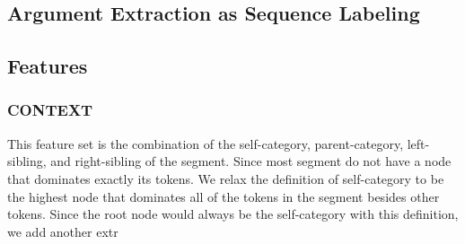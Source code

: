 \subsection{Argument Extraction as Sequence Labeling}

\subsection{Features}

\subsubsection{CONTEXT}

This feature set is the combination of the self-category, parent-category, left-sibling,
and right-sibling of the segment. Since most segment do not have a node that dominates
exactly its tokens. We relax the definition of self-category to be the highest node that
dominates all of the tokens in the segment besides other tokens. Since the root node would
always be the self-category with this definition, we add another extr
